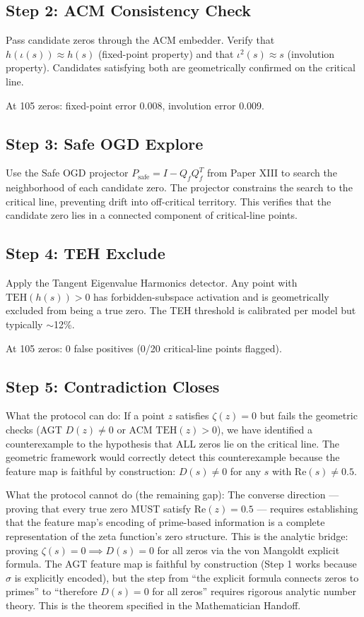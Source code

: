 \documentclass[11pt]{article}
\begin{document}
\subsection{Step 2: ACM Consistency Check}

Pass candidate zeros through the ACM embedder. Verify that $h(\iota(s)) \approx h(s)$ (fixed-point property) and that $\iota^2(s) \approx s$ (involution property). Candidates satisfying both are geometrically confirmed on the critical line.

At 105 zeros: fixed-point error 0.008, involution error 0.009.

\subsection{Step 3: Safe OGD Explore}

Use the Safe OGD projector $P_{\text{safe}} = I - Q_f Q_f^T$ from Paper XIII to search the neighborhood of each candidate zero. The projector constrains the search to the critical line, preventing drift into off-critical territory. This verifies that the candidate zero lies in a connected component of critical-line points.

\subsection{Step 4: TEH Exclude}

Apply the Tangent Eigenvalue Harmonics detector. Any point with $\mathrm{TEH}(h(s)) > 0$ has forbidden-subspace activation and is geometrically excluded from being a true zero. The TEH threshold is calibrated per model but typically $\sim$12\%.

At 105 zeros: 0 false positives (0/20 critical-line points flagged).

\subsection{Step 5: Contradiction Closes}

What the protocol can do: If a point $z$ satisfies $\zeta(z) = 0$ but fails the geometric checks (AGT $D(z) \neq 0$ or ACM $\mathrm{TEH}(z) > 0$), we have identified a counterexample to the hypothesis that ALL zeros lie on the critical line. The geometric framework would correctly detect this counterexample because the feature map is faithful by construction: $D(s) \neq 0$ for any $s$ with $\mathrm{Re}(s) \neq 0.5$.

What the protocol cannot do (the remaining gap): The converse direction --- proving that every true zero MUST satisfy $\mathrm{Re}(z) = 0.5$ --- requires establishing that the feature map's encoding of prime-based information is a complete representation of the zeta function's zero structure. This is the analytic bridge: proving $\zeta(s)=0 \implies D(s)=0$ for all zeros via the von Mangoldt explicit formula. The AGT feature map is faithful by construction (Step 1 works because $\sigma$ is explicitly encoded), but the step from ``the explicit formula connects zeros to primes'' to ``therefore $D(s)=0$ for all zeros'' requires rigorous analytic number theory. This is the theorem specified in the Mathematician Handoff.
\end{document}
